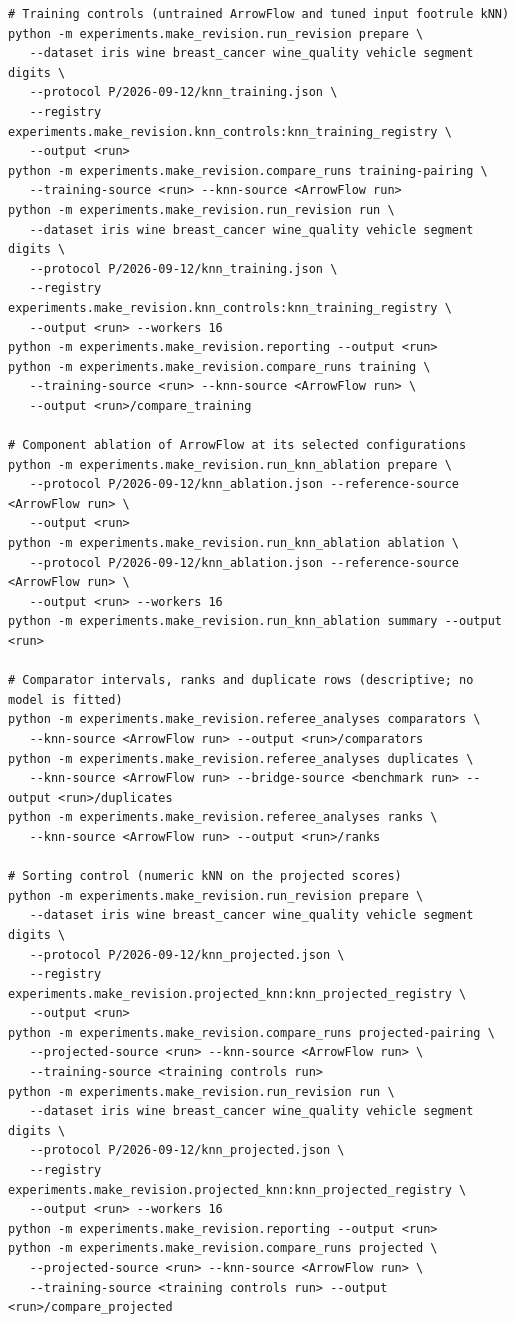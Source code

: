 \begin{scriptsize}
\begin{verbatim}
# Training controls (untrained ArrowFlow and tuned input footrule kNN)
python -m experiments.make_revision.run_revision prepare \
   --dataset iris wine breast_cancer wine_quality vehicle segment digits \
   --protocol P/2026-09-12/knn_training.json \
   --registry experiments.make_revision.knn_controls:knn_training_registry \
   --output <run>
python -m experiments.make_revision.compare_runs training-pairing \
   --training-source <run> --knn-source <ArrowFlow run>
python -m experiments.make_revision.run_revision run \
   --dataset iris wine breast_cancer wine_quality vehicle segment digits \
   --protocol P/2026-09-12/knn_training.json \
   --registry experiments.make_revision.knn_controls:knn_training_registry \
   --output <run> --workers 16
python -m experiments.make_revision.reporting --output <run>
python -m experiments.make_revision.compare_runs training \
   --training-source <run> --knn-source <ArrowFlow run> \
   --output <run>/compare_training

# Component ablation of ArrowFlow at its selected configurations
python -m experiments.make_revision.run_knn_ablation prepare \
   --protocol P/2026-09-12/knn_ablation.json --reference-source <ArrowFlow run> \
   --output <run>
python -m experiments.make_revision.run_knn_ablation ablation \
   --protocol P/2026-09-12/knn_ablation.json --reference-source <ArrowFlow run> \
   --output <run> --workers 16
python -m experiments.make_revision.run_knn_ablation summary --output <run>

# Comparator intervals, ranks and duplicate rows (descriptive; no model is fitted)
python -m experiments.make_revision.referee_analyses comparators \
   --knn-source <ArrowFlow run> --output <run>/comparators
python -m experiments.make_revision.referee_analyses duplicates \
   --knn-source <ArrowFlow run> --bridge-source <benchmark run> --output <run>/duplicates
python -m experiments.make_revision.referee_analyses ranks \
   --knn-source <ArrowFlow run> --output <run>/ranks

# Sorting control (numeric kNN on the projected scores)
python -m experiments.make_revision.run_revision prepare \
   --dataset iris wine breast_cancer wine_quality vehicle segment digits \
   --protocol P/2026-09-12/knn_projected.json \
   --registry experiments.make_revision.projected_knn:knn_projected_registry \
   --output <run>
python -m experiments.make_revision.compare_runs projected-pairing \
   --projected-source <run> --knn-source <ArrowFlow run> \
   --training-source <training controls run>
python -m experiments.make_revision.run_revision run \
   --dataset iris wine breast_cancer wine_quality vehicle segment digits \
   --protocol P/2026-09-12/knn_projected.json \
   --registry experiments.make_revision.projected_knn:knn_projected_registry \
   --output <run> --workers 16
python -m experiments.make_revision.reporting --output <run>
python -m experiments.make_revision.compare_runs projected \
   --projected-source <run> --knn-source <ArrowFlow run> \
   --training-source <training controls run> --output <run>/compare_projected


\end{verbatim}
\end{scriptsize}
